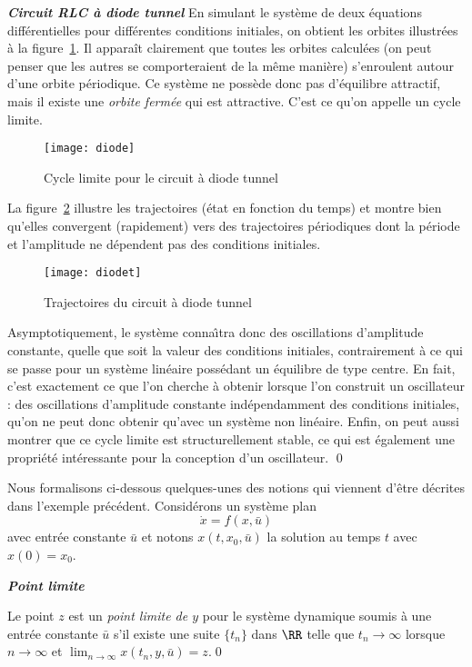 \begin{exemple} {\bf  \em Circuit RLC {à} diode tunnel}
En simulant le syst{è}me de deux {é}quations
diff{é}rentielles pour diff{é}rentes conditions initiales, on obtient les orbites
illustr{é}es  
{à} la figure~\ref{fig:diode}. Il apparaît clairement que toutes
les orbites calcul{é}es (on peut penser que les autres se comporteraient de la m{ê}me
mani{è}re) s'enroulent autour d'une orbite p{é}riodique. Ce syst{è}me ne
poss{è}de donc pas d'{é}quilibre attractif, mais il existe une {\em
orbite ferm{é}e} qui est attractive. C'est ce qu'on appelle un
cycle limite.
\begin{figure}[htbp] 
   \centering
   \texttt{[image: diode]} 
   \caption{Cycle limite pour le circuit {à} diode tunnel}
   \label{fig:diode}
\end{figure}
La figure~\ref{fig:simudiodet} illustre les trajectoires ({é}tat en fonction du temps) et 
montre bien qu'elles convergent (rapidement) vers des trajectoires p{é}riodiques dont la
p{é}riode et l'amplitude ne d{é}pendent pas des conditions initiales.
\begin{figure}[htbp] %
   \centering
   \texttt{[image: diodet]} 
   \caption{Trajectoires du circuit {à} diode tunnel}
   \label{fig:simudiodet}
\end{figure}

Asymptotiquement, le syst{è}me conna\^{\i}tra  donc des oscillations   
d'amplitude  constante, quelle que soit la valeur des conditions initiales,
contrairement {à} ce qui se passe pour un syst{è}me lin{é}aire poss{é}dant
un {é}quilibre de type centre. En fait, c'est exactement ce que l'on cherche {à}
obtenir lorsque l'on construit un oscillateur : des oscillations d'amplitude
constante ind{é}pendamment des conditions initiales, qu'on ne peut donc obtenir
qu'avec un syst{è}me non lin{é}aire. Enfin, on peut aussi montrer que ce cycle limite est
structurellement stable, ce qui est {é}galement une propri{é}t{é} int{é}ressante pour la
conception d'un oscillateur. 
\qed
\end{exemple}

Nous formalisons ci-dessous quelques-unes des notions qui viennent d'{ê}tre d{é}crites dans l'exemple précédent.
Consid{é}rons un syst{è}me plan $$\dot x=f(x,\bar u)$$ avec entrée constante $\bar u$ et notons $x(t,x_0,\bar u)$ la solution au temps $t$ avec $x(0)=x_0$.

\begin{definition}{\bf\em Point limite}

Le point $z$ est un {\em point limite de $y$} pour le syst{è}me dynamique  
soumis {à} une
entr{é}e constante $\bar u$  s'il existe une suite $\{t_n\}$ dans
$\RR$ telle que $t_n \rightarrow \infty$ lorsque $n \rightarrow \infty$ et
$\lim_{n\rightarrow \infty} x(t_n,y,\bar u)=z$.\qed
\end{definition}

